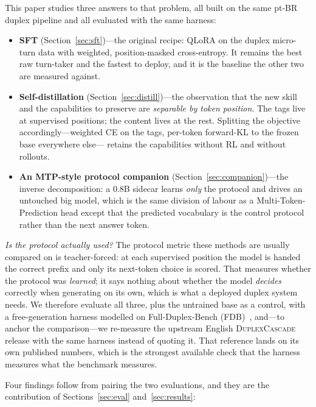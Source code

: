 \documentclass[conference]{IEEEtran}
\begin{document}
This paper studies three answers to that problem, all built on the same pt-BR
duplex pipeline and all evaluated with the same harness:

\begin{itemize}
  \item \textbf{SFT} (Section~\ref{sec:sft})---the original recipe: QLoRA on the
        duplex micro-turn data with weighted, position-masked cross-entropy. It
        remains the best raw turn-taker and the fastest to deploy, and it is the
        baseline the other two are measured against.
  \item \textbf{Self-distillation} (Section~\ref{sec:distill})---the observation
        that the new skill and the capabilities to preserve are \emph{separable
        by token position}. The tags live at supervised positions; the content
        lives at the rest. Splitting the objective accordingly---weighted CE on
        the tags, per-token forward-KL to the frozen base everywhere else---
        retains the capabilities without RL and without rollouts.
  \item \textbf{An MTP-style protocol companion}
        (Section~\ref{sec:companion})---the inverse decomposition: a 0.8B sidecar
        learns \emph{only} the protocol and drives an untouched big model, which
        is the same division of labour as a Multi-Token-Prediction head except
        that the predicted vocabulary is the control protocol rather than the
        next answer token.
\end{itemize}

\emph{Is the protocol actually used?} The protocol metric these methods are
usually compared on is teacher-forced: at each supervised position the model is
handed the correct prefix and only its next-token choice is scored. That measures
whether the protocol was \emph{learned}; it says nothing about whether the model
\emph{decides} correctly when generating on its own, which is what a deployed
duplex system needs. We therefore evaluate all three, plus the untrained base as
a control, with a free-generation harness modelled on Full-Duplex-Bench
(FDB)~\cite{lin2025fdb}, and---to anchor the comparison---we re-measure the
upstream English \textsc{DuplexCascade} release with the same harness instead of
quoting it. That reference lands on its own published numbers, which is the
strongest available check that the harness measures what the benchmark measures.

Four findings follow from pairing the two evaluations, and they are the
contribution of Sections~\ref{sec:eval} and~\ref{sec:results}:
\end{document}
